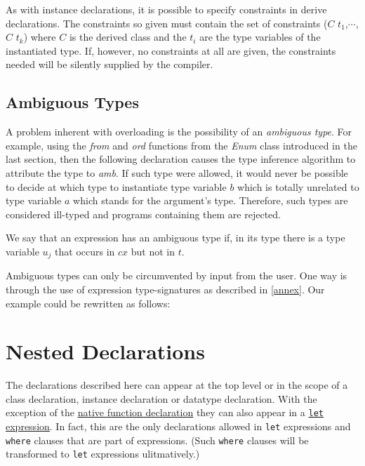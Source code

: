 As with instance declarations, it is possible to specify constraints in derive declarations. The constraints so given must contain the set of constraints  ($C$ $t_1$,$\cdots$, $C$ $t_k$) where $C$ is the derived class and  the $t_i$ are the type variables of the instantiated type. If, however, no constraints at all are given, the constraints needed will be silently supplied by the compiler.


\subsection{Ambiguous Types}

A problem inherent with overloading is the possibility of an \emph{ambiguous type}.
For example, using the \emph{from} and \emph{ord} functions from the \emph{Enum} class introduced in the last section, then the following declaration
causes the type inference algorithm to attribute the type
to \emph{amb}. If such type were allowed, it would never be possible to decide at which type to instantiate type variable $b$ which is totally unrelated to type variable $a$ which stands for the argument's type. Therefore, such types are considered ill-typed and programs containing them are rejected.

We say that an expression has an ambiguous type if, in its type 
there is a type variable $u_j$ that occurs in $cx$ but not in $t$.

Ambiguous types can only be circumvented by input from the user. One way is through the use of expression
type-signatures as described in \autoref{annex}. Our example could be rewritten as follows:

\section{Nested Declarations} \label{decl}

The declarations described here can appear at the top level or in the scope of a class  declaration, instance declaration or datatype declaration. With the exception of the \hyperref[nativefun]{native function declaration} they can also appear in a \hyperref[letexpr]{\texttt{let} expression}. In fact, this are the only declarations allowed in \texttt{let} expressions and \texttt{where} clauses that are part of expressions. (Such \texttt{where} clauses will be transformed to \texttt{let} expressions ulitmatively.)


